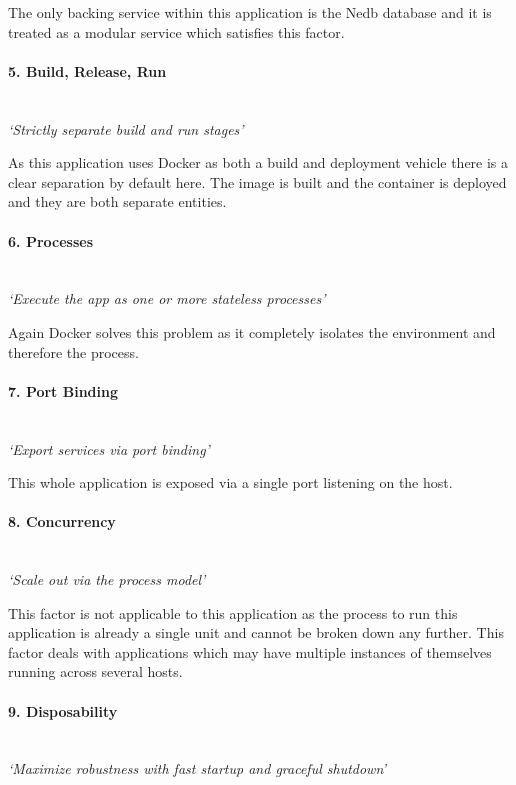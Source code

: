The only backing service within this application is the Nedb database and it is treated as a modular service which satisfies this factor.

\paragraph{5. Build, Release, Run}\mbox{}\\
\textit{`Strictly separate build and run stages'}

As this application uses Docker as both a build and deployment vehicle there is a clear separation by default here. The image is built and the container is deployed and they are both separate entities.

\paragraph{6. Processes}\mbox{}\\
\textit{`Execute the app as one or more stateless processes'}

Again Docker solves this problem as it completely isolates the environment and therefore the process.

\paragraph{7. Port Binding}\mbox{}\\
\textit{`Export services via port binding'}

This whole application is exposed via a single port listening on the host.

\paragraph{8. Concurrency}\mbox{}\\
\textit{`Scale out via the process model'}

This factor is not applicable to this application as the process to run this application is already a single unit and cannot be broken down any further. This factor deals with applications which may have multiple instances of themselves running across several hosts.

\paragraph{9. Disposability}\mbox{}\\
\textit{`Maximize robustness with fast startup and graceful shutdown'}

